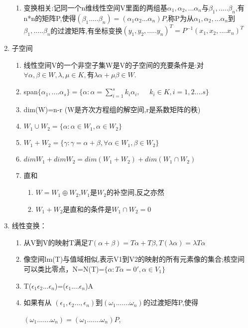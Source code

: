 \documentclass[11pt, a4paper, UTF8]{ctexart}
\begin{document}
\begin{solution}
\begin{enumerate}
\begin{enumerate}
      \item 变换相关:记同一个n维线性空间V里面的两组基$\alpha _1 ,\alpha _2,...\alpha _n$与$\beta _1,.....\beta _n$,有n*n的矩阵P,使得$(\beta _1.....\beta _n)=(\alpha _1 \alpha _2...\alpha _n)P$,称P为从$\alpha _1 ,\alpha _2,...\alpha _n$到$\beta _1,.....\beta _n$的过渡矩阵,有坐标变换$(y_1,y_2,.....y_n)^{T}=P^{-1}(x_1,x_2,....x_n)^{T}$
    \end{enumerate}
    \item 子空间
    \begin{enumerate}
      \item 线性空间V的一个非空子集W是V的子空间的充要条件是:对$\forall \alpha,\beta \in W, \lambda,\mu \in K,$有$\lambda \alpha +\mu \beta \in W.$
      \item span$\{\alpha _1,....\alpha _s\}=\{\alpha :
      \alpha =\sum _{i=1}^{s} k_i \alpha _i,~~~~~~k_i \in K,i=1,2....s\}$
      \item dim(W)=n-r (W是齐次方程组的解空间,r是系数矩阵的秩)
      \item $W_1 \cup W_2 =\{\alpha : \alpha \in W_1 ,\alpha \in W_2\}$
      \item $W_1 + W_2=\{\gamma : \gamma =\alpha+\beta, \forall \alpha \in W_1,\beta \in W_2\}$
      \item $dimW_1+dimW_2=dim(W_1+W_2)+dim(W_1\cap W_2)$
      \item 直和
      \begin{enumerate}
        \item $W=W_1\oplus W_2$,$W_1$是$W_2$的补空间,反之亦然
      \item  $W_1+W_2$是直和的条件是$W_1\cap W_2={0}$
      \end{enumerate}
    \end{enumerate}
    \item 线性变换：
    \begin{enumerate}
      \item 从V到V的映射T满足$T(\alpha+\beta)=T\alpha +T\beta , T(\lambda \alpha)=\lambda T \alpha $
      \item 像空间lm(T)与值域相似,表示V1到V2的映射的所有元素像的集合;核空间可以类比零点，N=N(T)=$\{\alpha :T\alpha =0',\alpha \in V_1\}$
      \item T($\epsilon _1 \epsilon _2 ...\epsilon _n $)=($\epsilon _1....\epsilon _n$)A
      \item 如果有从
      $(\epsilon _1,\epsilon _2 ...,\epsilon _n )$到$(\omega _1.......\omega _n)$的过渡矩阵P,使得
      
      $(\omega _1.......\omega _n)=(\omega _1.......\omega _n)P$,


\end{enumerate}
\end{enumerate}
\end{solution}
\end{document}
